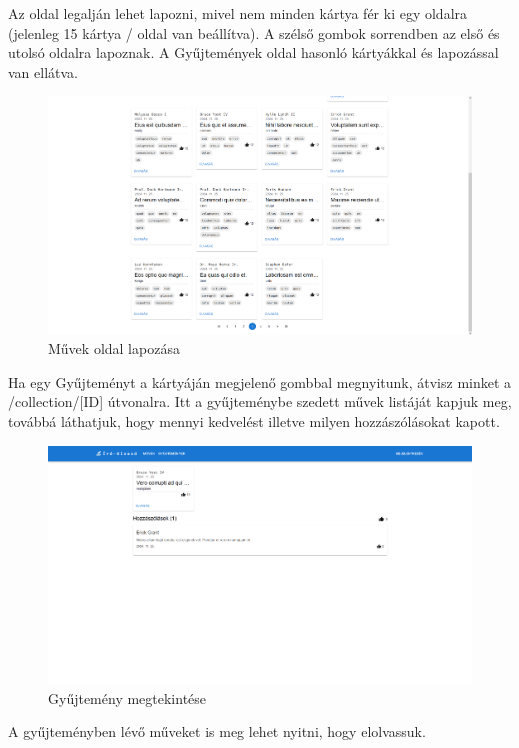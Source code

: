 Az oldal legalján lehet lapozni, mivel nem minden kártya fér ki egy oldalra (jelenleg 15 kártya / oldal van beállítva).
A szélső gombok sorrendben az első és utolsó oldalra lapoznak. A Gyűjtemények oldal hasonló kártyákkal és lapozással van ellátva.

\begin{figure}[H]
    \centering
    \includegraphics[scale=0.3]{./figures/works-pagination.png}
    \caption{Művek oldal lapozása}
    \label{fig:works-pagination}
\end{figure}

Ha egy Gyűjteményt a kártyáján megjelenő gombbal megnyitunk, átvisz minket a /collection/[ID] útvonalra.
Itt a gyűjteménybe szedett művek listáját kapjuk meg, továbbá láthatjuk, hogy mennyi kedvelést illetve milyen hozzászólásokat kapott.

\begin{figure}[H]
    \centering
    \includegraphics[scale=0.3]{./figures/collection-page.png}
    \caption{Gyűjtemény megtekintése}
    \label{fig:collection-page}
\end{figure}

A gyűjteményben lévő műveket is meg lehet nyitni, hogy elolvassuk.

